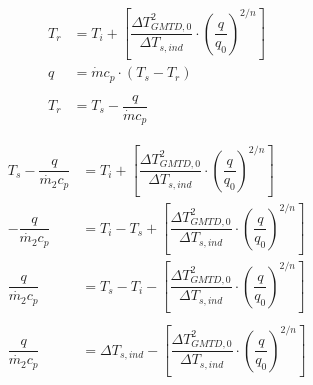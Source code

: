 \begin{equation}
	\begin{aligned}
		T_{r} &= T_i + \left[\dfrac{\Delta T_{GMTD,0}^2}{\Delta T_{s,ind}} \cdot \left(\dfrac{q}{q_0}\right)^{2/n}\right] \\
		q &= \dot{m} c_p \cdot (T_s - T_r) \\
		\\
		T_{r} &= T_s -\dfrac{q}{\dot{m} c_p}
	\end{aligned}
	\label{eq:PPGMTD}
\end{equation}

\begin{equation}
	\begin{aligned}
		T_s -\dfrac{q}{\dot{m_2} c_p} &= T_i + \left[\dfrac{\Delta T_{GMTD,0}^2}{\Delta T_{s,ind}} \cdot \left(\dfrac{q}{q_0}\right)^{2/n}\right] \\
		-\dfrac{q}{\dot{m_2} c_p} &= T_i - T_s + \left[\dfrac{\Delta T_{GMTD,0}^2}{\Delta T_{s,ind}} \cdot \left(\dfrac{q}{q_0}\right)^{2/n}\right]  \\
		\dfrac{q}{\dot{m_2} c_p} &= T_s - T_i - \left[\dfrac{\Delta T_{GMTD,0}^2}{\Delta T_{s,ind}} \cdot \left(\dfrac{q}{q_0}\right)^{2/n}\right]  \\
		\\
		\dfrac{q}{\dot{m_2} c_p} &= \Delta T_{s,ind} - \left[\dfrac{\Delta T_{GMTD,0}^2}{\Delta T_{s,ind}} \cdot \left(\dfrac{q}{q_0}\right)^{2/n}\right]  \\
	\end{aligned}
	\label{eq:PPGMTD}
\end{equation}

